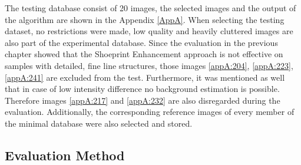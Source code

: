 \documentclass[draft,final]{vutinfth} %
\begin{document}
The testing database consist of 20 images, the selected images and the output of the algorithm are shown in the Appendix \ref{AppA}.
When selecting the testing dataset, no restrictions were made, low quality and heavily cluttered images are also part of the experimental database.
Since the evaluation in the previous chapter showed that the Shoeprint Enhancement approach is not effective on samples with detailed, fine line structures, those images \ref{appA:204}, \ref{appA:223}, \ref{appA:241} are excluded from the test.
Furthermore, it was mentioned as well that in case of low intensity difference no background estimation is possible. Therefore images \ref{appA:217} and \ref{appA:232} are also disregarded during the evaluation.
Additionally, the corresponding reference images of every member of the minimal database were also selected and stored.

\subsection{Evaluation Method}
\end{document}
